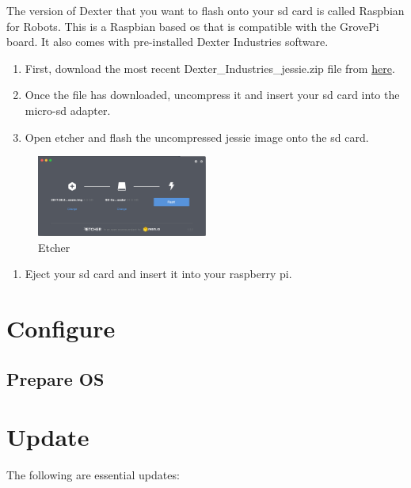The version of Dexter that you want to flash onto your sd card is called
Raspbian for Robots. This is a Raspbian based os that is compatible with
the GrovePi board. It also comes with pre-installed Dexter Industries
software.

\begin{enumerate}
\def\labelenumi{\arabic{enumi}.}
\tightlist
\item
  First, download the most recent Dexter\_Industries\_jessie.zip file
  from
  \href{https://sourceforge.net/projects/dexterindustriesraspbianflavor/}{here}.
\item
  Once the file has downloaded, uncompress it and insert your sd card
  into the micro-sd adapter.
\item
  Open etcher and flash the uncompressed jessie image onto the sd card.
\end{enumerate}

\begin{figure}[htb]
\centering
\includegraphics[width=0.5\textwidth]{images/etcher.png}
\caption{Etcher}
\end{figure}

\begin{enumerate}
\def\labelenumi{\arabic{enumi}.}
\setcounter{enumi}{3}
\tightlist
\item
  Eject your sd card and insert it into your raspberry pi.
\end{enumerate}

\section{Configure}\label{configure}

\subsection{Prepare OS}\label{prepare-os}

\section{Update}\label{update}

The following are essential updates:

